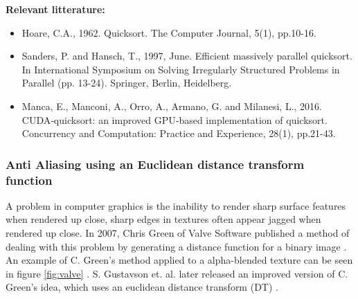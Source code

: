 \documentclass{article}
\begin{document}
\vspace{5mm}
\noindent \textbf{Relevant litterature:}
\begin{itemize}
    \item Hoare, C.A., 1962. Quicksort. The Computer Journal, 5(1), pp.10-16. \cite{hoare1962quicksort}
    \item Sanders, P. and Hansch, T., 1997, June. Efficient massively parallel quicksort. In International Symposium on Solving Irregularly Structured Problems in Parallel (pp. 13-24). Springer, Berlin, Heidelberg. \cite{sanders1997efficient}
    \item Manca, E., Manconi, A., Orro, A., Armano, G. and Milanesi, L., 2016. CUDA‐quicksort: an improved GPU‐based implementation of quicksort. Concurrency and Computation: Practice and Experience, 28(1), pp.21-43. \cite{manca2016cuda}
\end{itemize}

\subsubsection{Anti Aliasing using an Euclidean distance transform function}
A problem in computer graphics is the inability to render sharp surface features when rendered up close, sharp edges in textures often appear jagged when rendered up close. In 2007, Chris Green of Valve Software published a method of dealing with this problem by generating a distance function for a binary image \cite{green2007improved}. An example of C. Green's method applied to a  alpha-blended texture can be seen in figure \ref{fig:valve} \cite{green2007improved}. S. Gustavson et. al. later released an improved version of C. Green's idea, which uses an euclidean distance transform (DT) \cite{gustavson2011anti}\cite{gustavson20122d}. 
\end{document}
